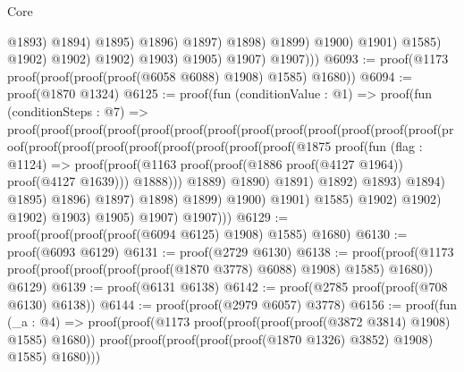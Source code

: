 \begin{lexlean}{Core}
\begin{coremodule}
                                          @1893)
                                        @1894)
                                      @1895)
                                    @1896)
                                  @1897)
                                @1898)
                              @1899)
                            @1900)
                          @1901)
                        @1585)
                      @1902)
                    @1902)
                  @1902)
                @1903)
              @1905)
            @1907)
          @1907)))
@6093 := proof(@1173 proof(proof(proof(proof(@6058 @6088) @1908) @1585) @1680))
@6094 := proof(@1870 @1324)
@6125 := proof(fun (conditionValue : @1) =>
    proof(fun (conditionSteps : @7) =>
      proof(proof(proof(proof(proof(proof(proof(proof(proof(proof(proof(proof(proof(proof(proof(proof(proof(proof(proof(proof(proof(proof(@1875
                                                    proof(fun (flag : @1124) =>
                                                      proof(proof(@1163
                                                            proof(proof(@1886 proof(@4127 @1964))
                                                                proof(@4127 @1639)))
                                                          @1888)))
                                                  @1889)
                                                @1890)
                                              @1891)
                                            @1892)
                                          @1893)
                                        @1894)
                                      @1895)
                                    @1896)
                                  @1897)
                                @1898)
                              @1899)
                            @1900)
                          @1901)
                        @1585)
                      @1902)
                    @1902)
                  @1902)
                @1903)
              @1905)
            @1907)
          @1907)))
@6129 := proof(proof(proof(proof(@6094 @6125) @1908) @1585) @1680)
@6130 := proof(@6093 @6129)
@6131 := proof(@2729 @6130)
@6138 := proof(proof(@1173 proof(proof(proof(proof(proof(@1870 @3778) @6088) @1908) @1585) @1680))
      @6129)
@6139 := proof(@6131 @6138)
@6142 := proof(@2785 proof(proof(@708 @6130) @6138))
@6144 := proof(proof(@2979 @6057) @3778)
@6156 := proof(fun (_a : @4) =>
    proof(proof(@1173 proof(proof(proof(proof(@3872 @3814) @1908) @1585) @1680))
        proof(proof(proof(proof(proof(@1870 @1326) @3852) @1908) @1585) @1680)))

\end{coremodule}
\end{lexlean}
